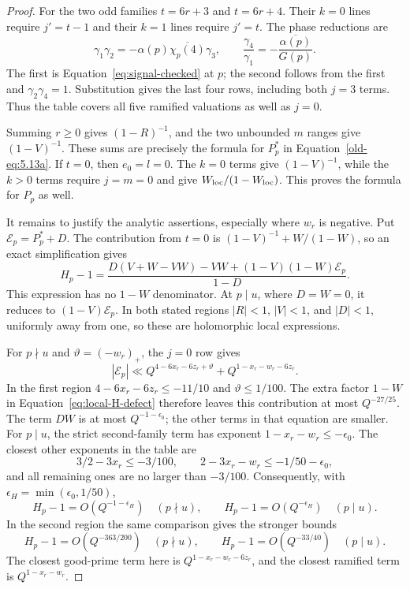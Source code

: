 \documentclass[12pt]{article}
\begin{document}
\begin{proof}
For the two odd families $t=6r+3$ and $t=6r+4$.  Their $k=0$
lines require $j'=t-1$ and their $k=1$ lines require $j'=t$.
The phase reductions are
\[
 \gamma_1\gamma_2
       =-\alpha(p)\overline{\chi_p(4)}\gamma_3,
 \qquad
 \frac{\gamma_4}{\gamma_1}
       =-\frac{\overline{\alpha(p)}}{G(p)}.
\]
The first is Equation~\eqref{eq:signal-checked} at $p$; the second follows
from the first and $\gamma_2\gamma_4=1$.  Substitution gives the
last four rows, including both $j=3$ terms.  Thus the table covers
all five ramified valuations as well as $j=0$.

Summing $r\ge0$ gives $(1-R)^{-1}$, and the two unbounded $m$
ranges give $(1-V)^{-1}$.  These sums are precisely the formula for
$P_p^*$ in Equation~\eqref{old-eq:5.13a}.  If $t=0$, then
$e_0=l=0$.  The $k=0$ terms give $(1-V)^{-1}$, while the $k>0$
terms require $j=m=0$ and give $W_{\rm loc}/(1-W_{\rm loc})$.
This proves the
formula for $P_p$ as well.

It remains to justify the analytic assertions, especially where
$w_r$ is negative.  Put $\mathcal E_p=P_p^*+D$.  The contribution
from $t=0$ is $(1-V)^{-1}+W/(1-W)$, so an exact simplification gives
\begin{equation}\label{eq:local-H-defect}
 H_p-1=
 \frac{D(V+W-VW)-VW+(1-V)(1-W)\mathcal E_p}{1-D}.
\end{equation}
This expression has no $1-W$ denominator.  At $p\mid u$, where
$D=W=0$, it reduces to $(1-V)\mathcal E_p$.  In both stated regions
$|R|<1$, $|V|<1$, and $|D|<1$, uniformly away from one, so these
are holomorphic local expressions.

For $p\nmid u$ and $\vartheta=(-w_r)_+$, the $j=0$ row gives
\[
 |\mathcal E_p|\ll
 Q^{4-6x_r-6z_r+\vartheta}+Q^{1-x_r-w_r-6z_r}.
\]
In the first region $4-6x_r-6z_r\le-11/10$ and
$\vartheta\le1/100$.  The extra factor $1-W$ in
Equation~\eqref{eq:local-H-defect} therefore leaves this contribution
at most $Q^{-27/25}$.  The term $DW$ is at most
$Q^{-1-\epsilon_0}$; the other terms in that equation are smaller.
For $p\mid u$, the strict second-family term has exponent
$1-x_r-w_r\le-\epsilon_0$.  The closest other exponents in the
table are
\[
 3/2-3x_r\le-3/100,\qquad
 2-3x_r-w_r\le-1/50-\epsilon_0,
\]
and all remaining ones are no larger than $-3/100$.
Consequently, with $\epsilon_H=\min(\epsilon_0,1/50)$,
\[
 H_p-1=O(Q^{-1-\epsilon_H})\quad(p\nmid u),\qquad
 H_p-1=O(Q^{-\epsilon_H})\quad(p\mid u).
\]
In the second region the same comparison gives the stronger bounds
\[
 H_p-1=O(Q^{-363/200})\quad(p\nmid u),\qquad
 H_p-1=O(Q^{-33/40})\quad(p\mid u).
\]
The closest good-prime term here is
$Q^{1-x_r-w_r-6z_r}$, and the closest ramified term is
$Q^{1-x_r-w_r}$.


\end{proof}
\end{document}

